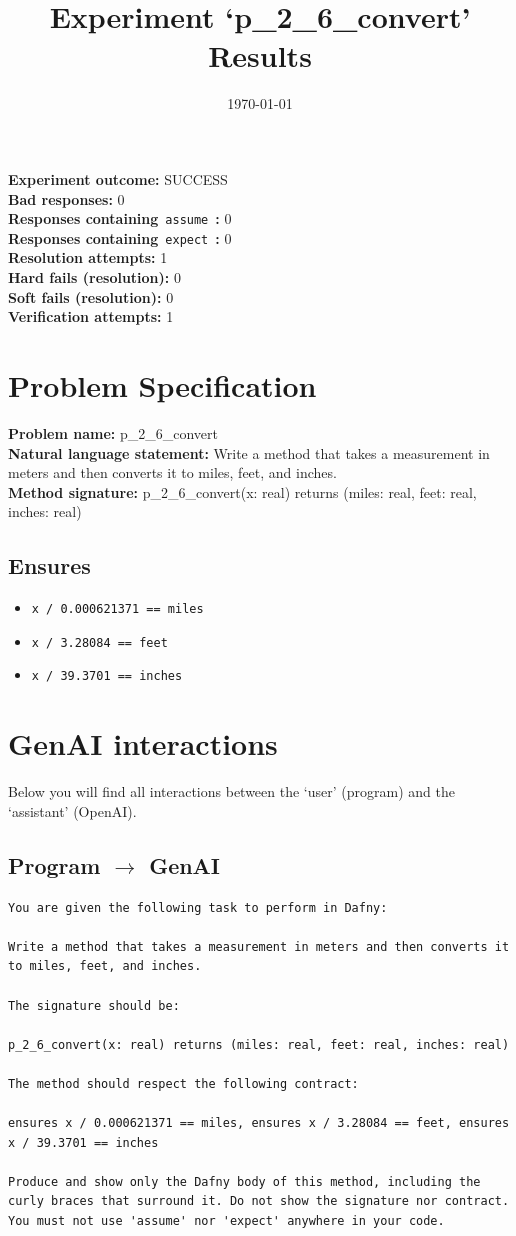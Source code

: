 \documentclass{article}
\begin{document}
\title{Experiment `p\_2\_6\_convert' Results}
\author{\today}
\date{}
\maketitle
\textbf{Experiment outcome: }SUCCESS
\\\textbf{Bad responses: }0
\\\textbf{Responses containing}~\texttt{assume}~\textbf{: }0
\\\textbf{Responses containing}~\texttt{expect}~\textbf{: }0
\\\textbf{Resolution attempts: }1
\\\textbf{Hard fails (resolution): }0
\\\textbf{Soft fails (resolution): }0
\\\textbf{Verification attempts: }1
\section*{Problem Specification}
\textbf{Problem name: }p\_2\_6\_convert
\\\textbf{Natural language statement: }Write a method that takes a measurement in meters and then converts it to miles, feet, and inches.
\\\textbf{Method signature: }p\_2\_6\_convert(x: real) returns (miles: real, feet: real, inches: real)
\subsection*{Ensures}
\begin{itemize}
\item \texttt{x / 0.000621371 == miles}
\item \texttt{x / 3.28084 == feet}
\item \texttt{x / 39.3701 == inches}
\end{itemize}
\clearpage
\section*{GenAI interactions}
Below you will find all interactions between the `user' (program) and the `assistant' (OpenAI).
\subsection*{Program $\rightarrow$ GenAI}
\begin{lstlisting}
You are given the following task to perform in Dafny:

Write a method that takes a measurement in meters and then converts it to miles, feet, and inches.

The signature should be:

p_2_6_convert(x: real) returns (miles: real, feet: real, inches: real)

The method should respect the following contract:

ensures x / 0.000621371 == miles, ensures x / 3.28084 == feet, ensures x / 39.3701 == inches

Produce and show only the Dafny body of this method, including the curly braces that surround it. Do not show the signature nor contract. You must not use 'assume' nor 'expect' anywhere in your code.
\end{lstlisting}
\end{document}
